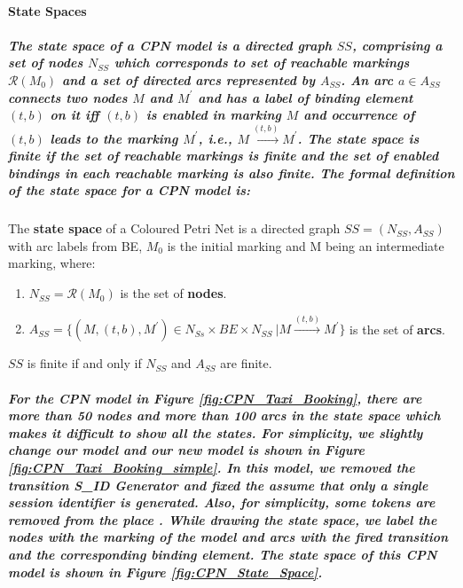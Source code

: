 \paragraph*{State Spaces}
\subparagraph*{\textnormal{The \textit{state space} of a CPN model is a directed graph $\mathit{SS}$, comprising a set of nodes $\mathit{N_{SS}}$ which corresponds to set of reachable markings $\mathit{\mathscr R(M_{0})}$ and a set of directed arcs represented by $\mathit{A_{SS}}$. An arc $\mathit{a \in A_{SS}}$ connects two nodes $\mathit{M}$ and $\mathit{M^{'}}$ and has a label of binding element $\mathit{(t,b)}$ on it iff $\mathit{(t,b)}$ is enabled in marking $\mathit{M}$ and occurrence of $\mathit{(t,b)}$ leads to the marking $\mathit{M^{'}}$, i.e., $\mathit{M \xrightarrow{(t,b)} M^{'}}$. The state space is finite if the set of reachable markings is finite and the set of enabled bindings in each reachable marking is also finite. The formal definition of the state space for a CPN model is:}}
\begin{defs}
	\label{defs:state_space}
	The \textbf{state space} of a Coloured Petri Net is a directed graph $\mathit{SS =
	(N_{SS},A_{SS})}$ with arc labels from BE, $\mathit{M_{0}}$ is the initial marking and M being an intermediate marking, where:
	\begin{enumerate}
		\item $\mathit{N_{SS} = \mathscr R(M_{0})}$ is the set of \textbf{nodes}.
		\item $\mathit{A_{SS} = \{ (M,(t,b),M^{'}) \in N_{Ss} \times BE \times N_{SS}\ | M \xrightarrow{(t,b)} M^{'} \}} $ is the set of \textbf{arcs}.
	\end{enumerate}
	$SS$ is finite if and only if $\mathit{N_{SS}}$ and $\mathit{A_{SS}}$ are finite.
\end{defs}

\subparagraph*{\textnormal{For the CPN model in Figure \ref{fig:CPN_Taxi_Booking}, there are more than 50 nodes and more than 100 arcs in the state space which makes it difficult to show all the states. For simplicity, we slightly change our model and our new model is shown in Figure \ref{fig:CPN_Taxi_Booking_simple}. In this model, we removed the transition \textit{S\_ID Generator} and fixed the assume that only a single session identifier is generated. Also, for simplicity, some tokens are removed from the place . While drawing the state space, we label the nodes with the marking of the model and arcs with the fired transition and the corresponding binding element. The state space of this CPN model is shown in Figure \ref{fig:CPN_State_Space}.}}

